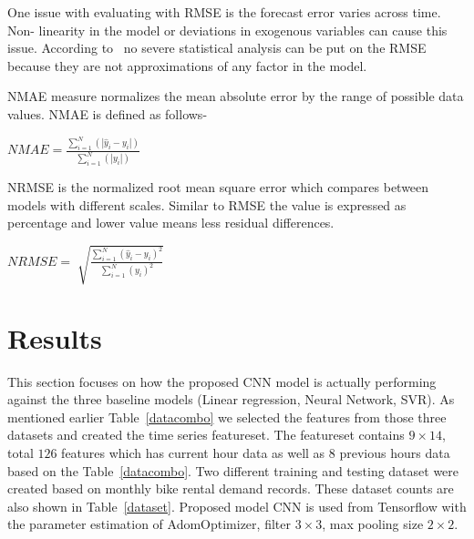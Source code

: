 One issue with evaluating with RMSE is the forecast error varies across time. Non- linearity in the model or deviations in exogenous variables can cause this issue. According to~\cite{fair1990comparing} no severe statistical analysis can be put on the RMSE because they are not approximations of any factor in the model. 


NMAE measure normalizes the mean absolute error by the range of possible data values. NMAE is defined as follows- 


$ NMAE=\frac{\sum_{i=1}^{N}(\left |  \hat y_i-y_i\right |)}{\sum_{i=1}^{N}(\left |  y_i\right |)}$

NRMSE is the normalized root mean square error which compares between models with different scales. Similar to RMSE the value is expressed as percentage and lower value means less residual differences. 

$  NRMSE=\sqrt[]{\frac{\sum_{i=1}^{N}(  \hat y_i-y_i)^2}{\sum_{i=1}^{N}(  y_i)^2} }$ \\

%




\section {Results}
\label {results}


This section focuses on how the proposed CNN model is actually performing against the three baseline models (Linear regression, Neural Network, SVR). As mentioned earlier Table~\ref{datacombo} we selected the features from those three datasets and created the time series featureset. The featureset contains $9\times14$, total $126$ features which has current hour data as well as 8 previous hours data based on the Table~\ref{datacombo}. Two different training and testing dataset were created based on monthly bike rental demand records. These dataset counts are also shown in Table~\ref{dataset}.  Proposed model CNN is used from Tensorflow with the parameter estimation of AdomOptimizer, filter $3\times 3 $, max pooling size $2 \times 2$.  

